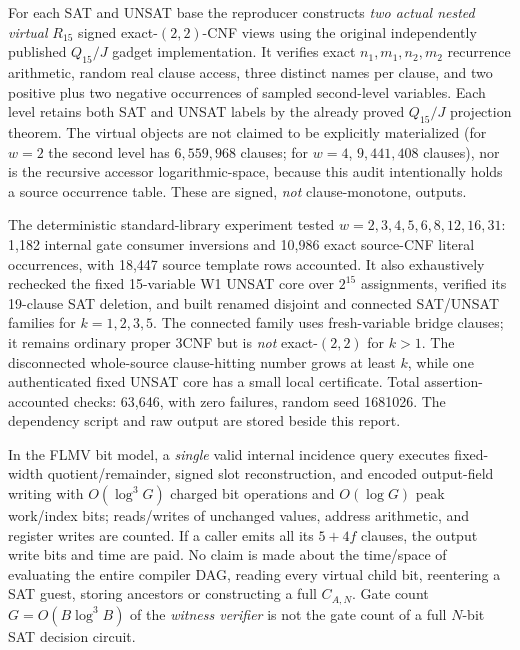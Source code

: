 \documentclass[11pt]{article}
\begin{document}
For each SAT and UNSAT base the reproducer constructs \emph{two actual nested virtual} $R_{15}$ signed exact-$(2,2)$-CNF views using the original independently published $Q_{15}/J$ gadget implementation. It verifies exact $n_1,m_1,n_2,m_2$ recurrence arithmetic, random real clause access, three distinct names per clause, and two positive plus two negative occurrences of sampled second-level variables. Each level retains both SAT and UNSAT labels by the already proved $Q_{15}/J$ projection theorem. The virtual objects are not claimed to be explicitly materialized (for $w=2$ the second level has $6{,}559{,}968$ clauses; for $w=4$, $9{,}441{,}408$ clauses), nor is the recursive accessor logarithmic-space, because this audit intentionally holds a source occurrence table. These are signed, \emph{not} clause-monotone, outputs.

The deterministic standard-library experiment tested $w=2,3,4,5,6,8,12,16,31$: 1,182 internal gate consumer inversions and 10,986 exact source-CNF literal occurrences, with 18,447 source template rows accounted. It also exhaustively rechecked the fixed 15-variable W1 UNSAT core over $2^{15}$ assignments, verified its 19-clause SAT deletion, and built renamed disjoint and connected SAT/UNSAT families for $k=1,2,3,5$. The connected family uses fresh-variable bridge clauses; it remains ordinary proper 3CNF but is \emph{not} exact-$(2,2)$ for $k>1$. The disconnected whole-source clause-hitting number grows at least $k$, while one authenticated fixed UNSAT core has a small local certificate. Total assertion-accounted checks: 63,646, with zero failures, random seed 1681026. The dependency script and raw output are stored beside this report.

In the FLMV bit model, a \emph{single} valid internal incidence query executes fixed-width quotient/remainder, signed slot reconstruction, and encoded output-field writing with $O(\log^3G)$ charged bit operations and $O(\log G)$ peak work/index bits; reads/writes of unchanged values, address arithmetic, and register writes are counted. If a caller emits all its $5+4f$ clauses, the output write bits and time are paid. No claim is made about the time/space of evaluating the entire compiler DAG, reading every virtual child bit, reentering a SAT guest, storing ancestors or constructing a full $C_{A,N}$. Gate count $G=O(B\log^3 B)$ of the \emph{witness verifier} is not the gate count of a full $N$-bit SAT decision circuit.
\end{document}
